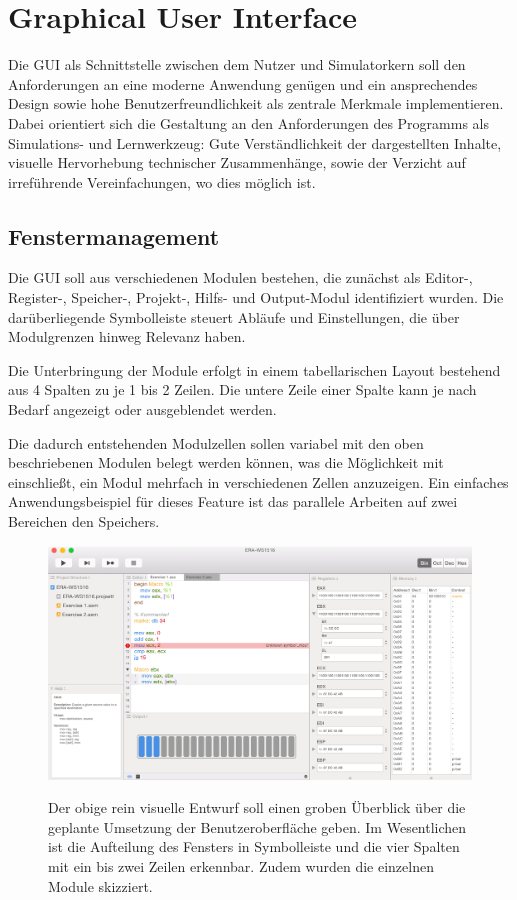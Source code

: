 \chapter{Graphical User Interface}

Die GUI als Schnittstelle zwischen dem Nutzer und Simulatorkern soll den Anforderungen an eine moderne Anwendung genügen und ein ansprechendes Design sowie hohe Benutzerfreundlichkeit als zentrale Merkmale implementieren. Dabei orientiert sich die Gestaltung an den Anforderungen des Programms als Simulations- und Lernwerkzeug: Gute Verständlichkeit der dargestellten Inhalte, visuelle Hervorhebung technischer Zusammenhänge, sowie der Verzicht auf irreführende Vereinfachungen, wo dies möglich ist.


\section{Fenstermanagement}

Die GUI soll aus verschiedenen Modulen bestehen, die zunächst als Editor-, Register-, Speicher-, Projekt-, Hilfs- und Output-Modul identifiziert wurden. Die darüberliegende Symbolleiste steuert Abläufe und Einstellungen, die über Modulgrenzen hinweg Relevanz haben.

Die Unterbringung der Module erfolgt in einem tabellarischen Layout bestehend aus 4 Spalten zu je 1 bis 2 Zeilen. Die untere Zeile einer Spalte kann je nach Bedarf angezeigt oder ausgeblendet werden.

Die dadurch entstehenden Modulzellen sollen variabel mit den oben beschriebenen Modulen belegt werden können, was die Möglichkeit mit einschließt, ein Modul mehrfach in verschiedenen Zellen anzuzeigen. Ein einfaches Anwendungsbeispiel für dieses Feature ist das parallele Arbeiten auf zwei Bereichen den Speichers.

\begin{figure}
  \includegraphics[width=\textwidth]{../ui/figures/mockup}
  \label{fig:Mockup}
  \caption{Der obige rein visuelle Entwurf soll einen groben Überblick über die geplante Umsetzung der Benutzeroberfläche geben. Im Wesentlichen ist die Aufteilung des Fensters in Symbolleiste und die vier Spalten mit ein bis zwei Zeilen erkennbar. Zudem wurden die einzelnen Module skizziert.}
\end{figure}

